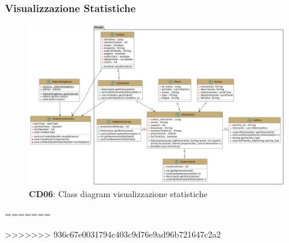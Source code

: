     \subsubsection{Visualizzazione Statistiche}
        \begin{figure}[H]
            \centering
            \includegraphics[scale=0.2]{assets/diagrammi/Class diagram di design/gestione statistiche.png}
            \caption*{\textbf{CD06}: Class diagram visualizzazione statistiche}\label{fig:ClassDiagram_ViewStats}
        \end{figure}
=======


>>>>>>> 936c67e0031794c403c9d76e9ad96b721647c2a2
